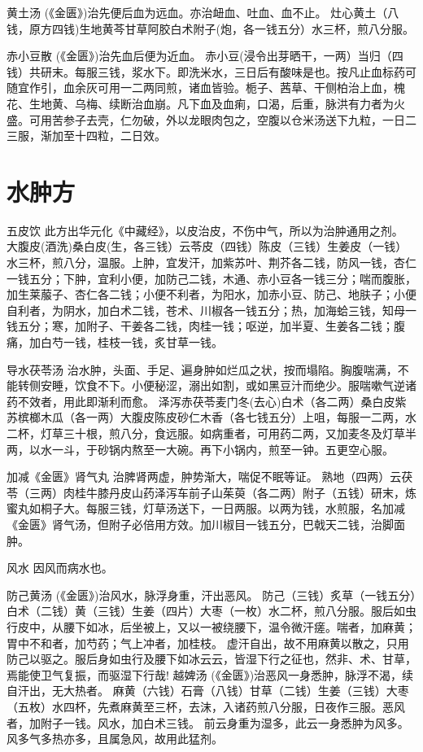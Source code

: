 \documentclass[a4paper,12pt,UTF8,twoside]{ctexbook}
\begin{document}
	黄土汤
	(《金匮》)治先便后血为远血。亦治衄血、吐血、血不止。
	灶心黄土（八钱，原方四钱)生地黄芩甘草阿胶白术附子(炮，各一钱五分）水三杯，煎八分服。
	
	赤小豆散
	(《金匮》)治先血后便为近血。
	赤小豆(浸令出芽晒干，一两）当归（四钱）共研末。每服三钱，浆水下。即洗米水，三日后有酸味是也。按凡止血标药可随宜作引，血余灰可用一二两同煎，诸血皆验。栀子、茜草、干侧柏治上血，槐花、生地黄、乌梅、续断治血崩。凡下血及血痢，口渴，后重，脉洪有力者为火盛。可用苦参子去壳，仁勿破，外以龙眼肉包之，空腹以仓米汤送下九粒，一日二三服，渐加至十四粒，二日效。
	
	
	
	\chapter{水肿方}
		
	五皮饮
	此方出华元化《中藏经》，以皮治皮，不伤中气，所以为治肿通用之剂。
	大腹皮(酒洗)桑白皮(生，各三钱）云苓皮（四钱）陈皮（三钱）生姜皮（一钱）水三杯，煎八分，温服。上肿，宜发汗，加紫苏叶、荆芥各二钱，防风一钱，杏仁一钱五分；下肿，宜利小便，加防己二钱，木通、赤小豆各一钱三分；喘而腹胀，加生莱菔子、杏仁各二钱；小便不利者，为阳水，加赤小豆、防己、地肤子；小便自利者，为阴水，加白术二钱，苍术、川椒各一钱五分；热，加海蛤三钱，知母一钱五分；寒，加附子、干姜各二钱，肉桂一钱；呕逆，加半夏、生姜各二钱；腹痛，加白芍一钱，桂枝一钱，炙甘草一钱。
	
	导水茯苓汤
	治水肿，头面、手足、遍身肿如烂瓜之状，按而塌陷。胸腹喘满，不能转侧安睡，饮食不下。小便秘涩，溺出如割，或如黑豆汁而绝少。服喘嗽气逆诸药不效者，用此即渐利而愈。
	泽泻赤茯苓麦门冬(去心)白术（各二两）桑白皮紫苏槟榔木瓜（各一两）大腹皮陈皮砂仁木香（各七钱五分）上咀，每服一二两，水二杯，灯草三十根，煎八分，食远服。如病重者，可用药二两，又加麦冬及灯草半两，以水一斗，于砂锅内熬至一大碗。再下小锅内，煎至一钟。五更空心服。
	
	加减《金匮》肾气丸
	治脾肾两虚，肿势渐大，喘促不眠等证。
	熟地（四两）云茯苓（三两）肉桂牛膝丹皮山药泽泻车前子山茱萸（各二两）附子（五钱）研末，炼蜜丸如桐子大。每服三钱，灯草汤送下，一日两服。以两为钱，水煎服，名加减《金匮》肾气汤，但附子必倍用方效。加川椒目一钱五分，巴戟天二钱，治脚面肿。
	
	
	风水	
	因风而病水也。
	
	防己黄汤
	(《金匮》)治风水，脉浮身重，汗出恶风。
	防己（三钱）炙草（一钱五分）白术（二钱）黄（三钱）生姜（四片）大枣（一枚）水二杯，煎八分服。服后如虫行皮中，从腰下如冰，后坐被上，又以一被绕腰下，温令微汗瘥。喘者，加麻黄；胃中不和者，加芍药；气上冲者，加桂枝。
	虚汗自出，故不用麻黄以散之，只用防己以驱之。服后身如虫行及腰下如冰云云，皆湿下行之征也，然非、术、甘草，焉能使卫气复振，而驱湿下行哉!
	越婢汤
	(《金匮》)治恶风一身悉肿，脉浮不渴，续自汗出，无大热者。
	麻黄（六钱）石膏（八钱）甘草（二钱）生姜（三钱）大枣（五枚）水四杯，先煮麻黄至三杯，去沫，入诸药煎八分服，日夜作三服。恶风者，加附子一钱。风水，加白术三钱。
	前云身重为湿多，此云一身悉肿为风多。风多气多热亦多，且属急风，故用此猛剂。
	
\end{document}
